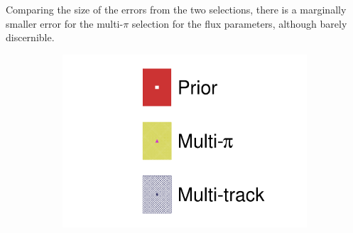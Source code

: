 Comparing the size of the errors from the two selections, there is a marginally smaller error for the multi-$\pi$ selection for the flux parameters, although barely discernible.
\begin{figure}[h]
	\centering
	\begin{subfigure}[t]{0.10\textwidth}
		\includegraphics[width=\textwidth,page=1, trim={0mm 0mm 0mm 9mm}, clip]{figures/mach3/2018/asimov/2018a_FixedCov_RedCov_Mpi_Asimov_merg_2018a_NewDetMatrix_OrderSwitched_Data2to8_merge}
	\end{subfigure}
	

\end{figure}
